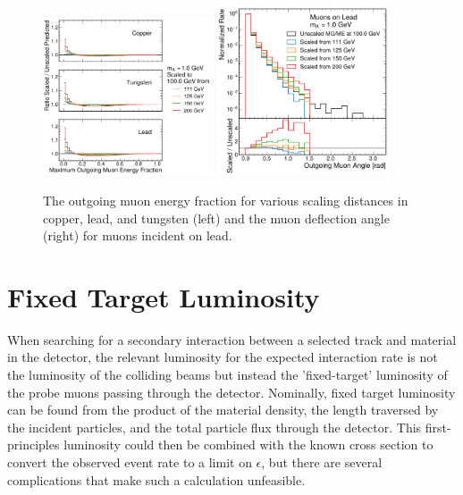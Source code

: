 \begin{figure}[!htbp]
    \centering
    \includegraphics[width=0.45\textwidth]{figures/muon_efrac_cumulative_ratio.pdf}
    \hspace{0.01\textwidth}
    \includegraphics[width=0.45\textwidth]{figures/muon_lead_ang.pdf}
    \caption[
        Validation of simulated \dbrem kinematics.
    ]{
        The outgoing muon energy fraction for various scaling distances in copper, lead, and tungsten (left) and the muon deflection angle (right) for muons incident on lead.
    }
    \label{fig:dbrem_validation}
\end{figure}

\section{Fixed Target Luminosity}
\label{sec:fixedLumi}
When searching for a secondary interaction between a selected track and material in the detector, the relevant luminosity for the expected interaction rate is not the luminosity of the colliding beams but instead the 'fixed-target' luminosity of the probe muons passing through the detector.
Nominally, fixed target luminosity can be found from the product of the material density, the length traversed by the incident particles, and the total particle flux through the detector.
This first-principles luminosity could then be combined with the known \dbrem cross section to convert the observed event rate to a limit on $\epsilon$, but there are several complications that make such a calculation unfeasible.

